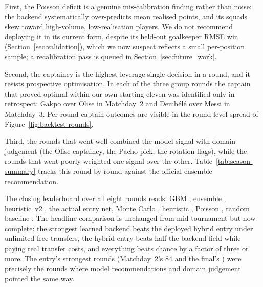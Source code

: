 First, the Poisson deficit is a genuine mis-calibration finding
rather than noise: the backend systematically over-predicts mean
realised points, and its squads skew toward high-volume,
low-realisation players. We do not recommend deploying it in its
current form, despite its held-out goalkeeper RMSE win
(Section~\ref{sec:validation}), which we now suspect reflects a
small per-position sample; a recalibration pass is queued in
Section~\ref{sec:future_work}.

Second, the captaincy is the highest-leverage single decision in a
round, and it resists prospective optimisation. In each of the three
group rounds the captain that proved optimal within our own starting
eleven was identified only in retrospect: Gakpo over Olise in
Matchday~2 and Demb\'el\'e over Messi in Matchday~3. Per-round
captain outcomes are visible in the round-level spread of
Figure~\ref{fig:backtest-rounds}.

Third, the rounds that went well combined the model signal with
domain judgement (the Olise captaincy, the Pacho pick, the rotation
flags), while the rounds that went poorly weighted one signal over
the other. Table~\ref{tab:season-summary} tracks this round by
round against the official ensemble recommendation.

The closing leaderboard over all eight rounds reads: GBM
\TotalGbm{}, ensemble \TotalEnsemble{}, heuristic~v2
\TotalHeuristicVTwo{}, the actual entry \TotalUserActualNet{} net,
Monte Carlo \TotalMonteCarlo{}, heuristic \TotalHeuristic{}, Poisson
\TotalPoisson{}, random baseline \TotalRandomBaselineMean{}. The
headline comparison is unchanged from mid-tournament but now
complete: the strongest learned backend beats the deployed hybrid
entry under unlimited free transfers, the hybrid entry beats half
the backend field while paying real transfer costs, and everything
beats chance by a factor of three or more. The entry's strongest
rounds (Matchday~2's 84 and the final's \FinalRoundNet{}) were
precisely the rounds where model recommendations and domain
judgement pointed the same way.

\begin{table}[t]
  \centering
  \small
  
  \caption{Realized fantasy points per round for every backend replayed
    on frozen pre-round data, alongside the user's actual entry and a
    random-squad baseline.
    }
  \label{tab:backtest-rounds}
\end{table}

